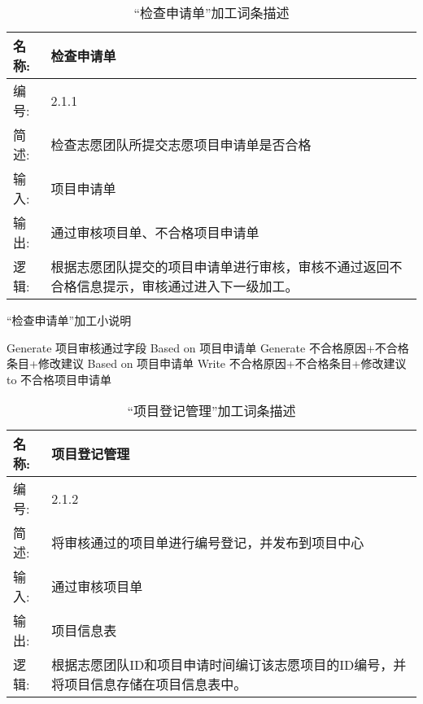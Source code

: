 \begin{table}[H]  
\caption{“检查申请单”加工词条描述}  
\begin{center}  
    \begin{tabular}{l p{11cm}} 
        \hline
        \quad 名称: & 检查申请单\\
        \hline
        \quad 编号: & 2.1.1 \\
        \hline
        \quad 简述: & 检查志愿团队所提交志愿项目申请单是否合格 \\
        \hline
        \quad 输入:& 项目申请单 \\
        \hline
        \quad 输出:& 通过审核项目单、不合格项目申请单\\
        \hline
        \quad 逻辑:& 根据志愿团队提交的项目申请单进行审核，审核不通过返回不合格信息提示，审核通过进入下一级加工。 \\
        \hline
    \end{tabular}
    \label{tab1}
\end{center}
\end{table}

\begin{algorithm}[H]
    \renewcommand{\thealgorithm}{}
    \caption{“检查申请单”加工小说明} 
    \label{alg3} 
    \begin{algorithmic}[1]
        \STATE Generate 项目审核通过字段 Based on 项目申请单
        \ELSE
        \STATE Generate 不合格原因+{不合格条目+修改建议} Based on 项目申请单
        \STATE Write 不合格原因+{不合格条目+修改建议} to 不合格项目申请单
        \ENDIF 
    \end{algorithmic} 
\end{algorithm}



\begin{table}[H]  
\caption{“项目登记管理”加工词条描述}  
\begin{center}  
    \begin{tabular}{l p{11cm}} 
        \hline
        \quad 名称: & 项目登记管理\\
        \hline
        \quad 编号: & 2.1.2 \\
        \hline
        \quad 简述: & 将审核通过的项目单进行编号登记，并发布到项目中心 \\
        \hline
        \quad 输入:& 通过审核项目单 \\
        \hline
        \quad 输出:& 项目信息表\\
        \hline
        \quad 逻辑:& 根据志愿团队ID和项目申请时间编订该志愿项目的ID编号，并将项目信息存储在项目信息表中。 \\
        \hline
    \end{tabular}
    \label{tab1}
\end{center}
\end{table}


